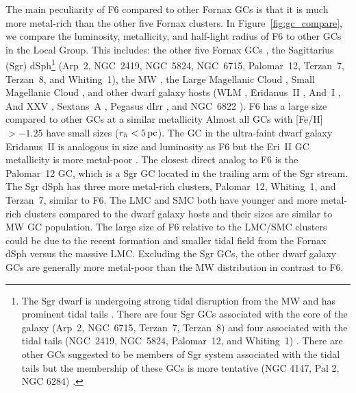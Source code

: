 \documentclass[twocolumn]{aastex63}
\begin{document}
The main peculiarity  of F6 compared to other Fornax GCs is that it is much more metal-rich than the other five Fornax clusters. 
In Figure~\ref{fig:gc_compare}, we compare the luminosity, metallicity, and half-light radius of F6 to other GCs in the Local Group. 
This includes:  the other five Fornax GCs \citep{Mackey2003MNRAS.340..175M, Letarte2006A&A...453..547L, Larsen2012A&A...546A..53L}, the Sagittarius (Sgr) dSph\footnote{The Sgr dwarf is undergoing strong tidal disruption from the MW and has prominent tidal tails \citep[e.g.,][]{Majewski2003ApJ...599.1082M, Ramos2020A&A...638A.104R}.
There are four Sgr GCs associated with the core of the galaxy (Arp~2, NGC~6715, Terzan~7, Terzan~8) \citep{DaCosta1995AJ....109.2533D} and four  associated with the tidal tails (NGC~2419, NGC~5824, Palomar~12, and Whiting~1) \citep[e.g.,][]{Law2010ApJ...718.1128L, Massari2019A&A...630L...4M, Kruijssen2020MNRAS.498.2472K}. 
There are other GCs suggested to be members of Sgr system associated with the tidal tails but the membership of these GCs is more tentative (NGC 4147, Pal 2, NGC 6284) \citep[e.g.,][]{Law2010ApJ...718.1128L, Bellazzini2020A&A...636A.107B}.} (Arp~2, NGC~2419, NGC~5824, NGC~6715, Palomar~12, Terzan~7, Terzan~8, and Whiting~1), the MW \citep[][2010 edition]{Harris1996AJ....112.1487H}, the Large Magellanic Cloud \citep[LMC;][]{Mackey2003MNRAS.338...85M, Pessev2006AJ....132..781P, Pessev2008MNRAS.385.1535P, Song2021MNRAS.504.4160S}, Small Magellanic Cloud \citep[SMC;][]{Mackey2003MNRAS.338..120M, Pessev2006AJ....132..781P, Pessev2008MNRAS.385.1535P, Song2021MNRAS.504.4160S} , and other dwarf galaxy hosts 
(WLM \citep{Hodge1999ApJ...521..577H, Stephens2006AJ....131.1426S}, Eridanus~II \citep{Simon2021ApJ...908...18S}, And~I \citep{Caldwell2017PASA...34...39C}, And XXV \citep{Cusano2016ApJ...829...26C}, Sextans~A \citep{Beasley2019MNRAS.487.1986B}, Pegasus dIrr \citep{Cole2017ApJ...837...54C, Leaman2020MNRAS.492.5102L}, and NGC~6822 \citep{Hwang2011ApJ...738...58H, Hwang2014ApJ...783...49H}).
F6 has a large size compared to other GCs at a similar metallicity 
Almost all GCs with [Fe/H]$>-1.25$ have small sizes ($r_h < 5 \mathrm{\,pc}$).
The GC in the ultra-faint dwarf galaxy Eridanus~II is analogous in size and luminosity as F6 but the Eri~II GC metallicity is more metal-poor \citep[${\rm [Fe/H]}\approx -2$;][]{Zoutendijk2020A&A...635A.107Z, Simon2021ApJ...908...18S}.
The closest direct analog to F6 is the Palomar~12 GC, which is a Sgr GC located in the trailing arm of the Sgr stream. 
The Sgr dSph has three more metal-rich clusters, Palomar~12, Whiting~1, and Terzan~7, similar to F6. 
The LMC and SMC both have younger and more metal-rich clusters compared to the dwarf galaxy hosts and their sizes are  similar to MW GC population.
The large size of F6 relative to the LMC/SMC clusters could be due to the recent formation and smaller tidal field from the Fornax dSph versus  the massive LMC.  
Excluding the Sgr GCs, the other dwarf galaxy GCs are  generally more metal-poor than the MW distribution in contrast to F6. 
\end{document}
